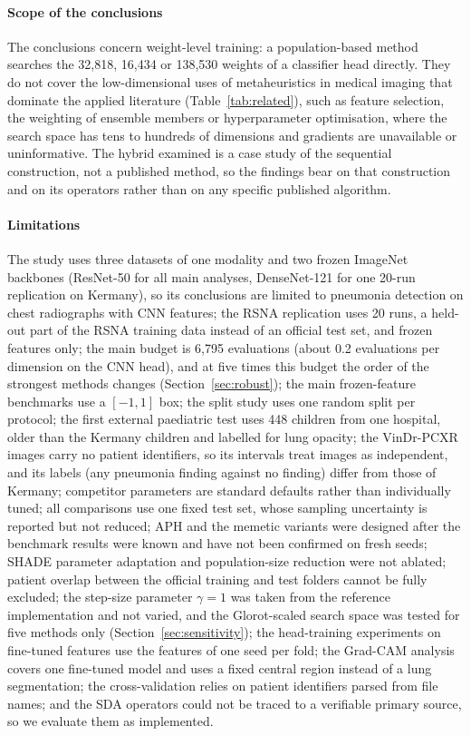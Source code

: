 \documentclass[preprint,12pt]{elsarticle}
\begin{document}
\paragraph{Scope of the conclusions} The conclusions concern weight-level training: a population-based method searches the 32,818, 16,434 or 138,530 weights of a classifier head directly. They do not cover the low-dimensional uses of metaheuristics in medical imaging that dominate the applied literature (Table~\ref{tab:related}), such as feature selection, the weighting of ensemble members or hyperparameter optimisation, where the search space has tens to hundreds of dimensions and gradients are unavailable or uninformative. The hybrid examined is a case study of the sequential construction, not a published method, so the findings bear on that construction and on its operators rather than on any specific published algorithm.

\paragraph{Limitations} The study uses three datasets of one modality and two frozen ImageNet backbones (ResNet-50 for all main analyses, DenseNet-121 for one 20-run replication on Kermany), so its conclusions are limited to pneumonia detection on chest radiographs with CNN features; the RSNA replication uses 20 runs, a held-out part of the RSNA training data instead of an official test set, and frozen features only; the main budget is 6,795 evaluations (about 0.2 evaluations per dimension on the CNN head), and at five times this budget the order of the strongest methods changes (Section~\ref{sec:robust}); the main frozen-feature benchmarks use a $[-1,1]$ box; the split study uses one random split per protocol; the first external paediatric test uses 448 children from one hospital, older than the Kermany children and labelled for lung opacity; the VinDr-PCXR images carry no patient identifiers, so its intervals treat images as independent, and its labels (any pneumonia finding against no finding) differ from those of Kermany; competitor parameters are standard defaults rather than individually tuned; all comparisons use one fixed test set, whose sampling uncertainty is reported but not reduced; APH and the memetic variants were designed after the benchmark results were known and have not been confirmed on fresh seeds; SHADE parameter adaptation and population-size reduction were not ablated; patient overlap between the official training and test folders cannot be fully excluded; the step-size parameter $\gamma=1$ was taken from the reference implementation and not varied, and the Glorot-scaled search space was tested for five methods only (Section~\ref{sec:sensitivity}); the head-training experiments on fine-tuned features use the features of one seed per fold; the Grad-CAM analysis covers one fine-tuned model and uses a fixed central region instead of a lung segmentation; the cross-validation relies on patient identifiers parsed from file names; and the SDA operators could not be traced to a verifiable primary source, so we evaluate them as implemented.
\end{document}
